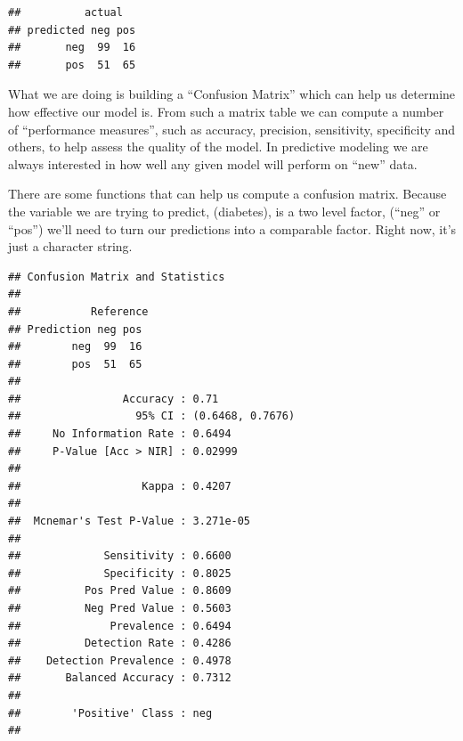 \documentclass[
]{article}
\newenvironment{Shaded}{\begin{snugshade}}{\end{snugshade}}
\newcommand{\FunctionTok}[1]{\textcolor[rgb]{0.00,0.00,0.00}{#1}}
\newcommand{\NormalTok}[1]{#1}
\newcommand{\SpecialCharTok}[1]{\textcolor[rgb]{0.00,0.00,0.00}{#1}}
\begin{document}
\begin{verbatim}
##          actual
## predicted neg pos
##       neg  99  16
##       pos  51  65
\end{verbatim}

What we are doing is building a ``Confusion Matrix'' which can help us
determine how effective our model is. From such a matrix table we can
compute a number of ``performance measures'', such as accuracy,
precision, sensitivity, specificity and others, to help assess the
quality of the model. In predictive modeling we are always interested in
how well any given model will perform on ``new'' data.

There are some functions that can help us compute a confusion matrix.
Because the variable we are trying to predict, (diabetes), is a two
level factor, (``neg'' or ``pos'') we'll need to turn our predictions
into a comparable factor. Right now, it's just a character string.

\begin{Shaded}
\end{Shaded}

\begin{verbatim}
## Confusion Matrix and Statistics
## 
##           Reference
## Prediction neg pos
##        neg  99  16
##        pos  51  65
##                                           
##                Accuracy : 0.71            
##                  95% CI : (0.6468, 0.7676)
##     No Information Rate : 0.6494          
##     P-Value [Acc > NIR] : 0.02999         
##                                           
##                   Kappa : 0.4207          
##                                           
##  Mcnemar's Test P-Value : 3.271e-05       
##                                           
##             Sensitivity : 0.6600          
##             Specificity : 0.8025          
##          Pos Pred Value : 0.8609          
##          Neg Pred Value : 0.5603          
##              Prevalence : 0.6494          
##          Detection Rate : 0.4286          
##    Detection Prevalence : 0.4978          
##       Balanced Accuracy : 0.7312          
##                                           
##        'Positive' Class : neg             
## 
\end{verbatim}
\end{document}
